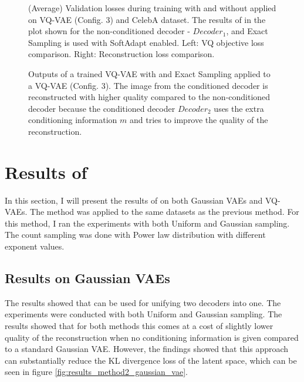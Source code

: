 \begin{figure}[H]
    \centering
    \scalebox{0.48}{}
    \scalebox{0.48}{}
    \caption[Validation loss comparison during training of a Gaussian VAE.]
    {
        (Average) Validation losses during training with and without  applied on VQ-VAE (Config. 3) and CelebA dataset. The results of  in the plot shown for the non-conditioned decoder - $Decoder_1$, and Exact Sampling is used with SoftAdapt enabled.
        Left: VQ objective loss comparison. Right: Reconstruction loss comparison.
    }
    \label{fig:results_method1_vq_vae}
\end{figure}

\begin{figure}[H]
    \centering
    
    \caption[Trained neural network with  applied to a VQ-VAE.]
    {
        Outputs of a trained VQ-VAE with  and Exact Sampling applied to a VQ-VAE (Config. 3). The image from the conditioned decoder is reconstructed with higher quality compared to the non-conditioned decoder because the conditioned decoder $Decoder_2$ uses the extra conditioning information $m$ and tries to improve the quality of the reconstruction.
    }
    \label{fig:rec_vqvae}
\end{figure}


\section{Results of }

In this section, I will present the results of  on both Gaussian VAEs and VQ-VAEs. The method was applied to the same datasets as the previous method. For this method, I ran the experiments with both Uniform and Gaussian sampling. The count sampling was done with Power law distribution with different exponent values.

\subsection{Results on Gaussian VAEs}

The results showed that  can be used for unifying two decoders into one. The experiments were conducted with both Uniform and Gaussian sampling. The results showed that for both methods this comes at a cost of slightly lower quality of the reconstruction when no conditioning information is given compared to a standard Gaussian VAE. However, the findings showed that this approach can substantially reduce the KL divergence loss of the latent space, which can be seen in figure \ref{fig:results_method2_gaussian_vae}.

